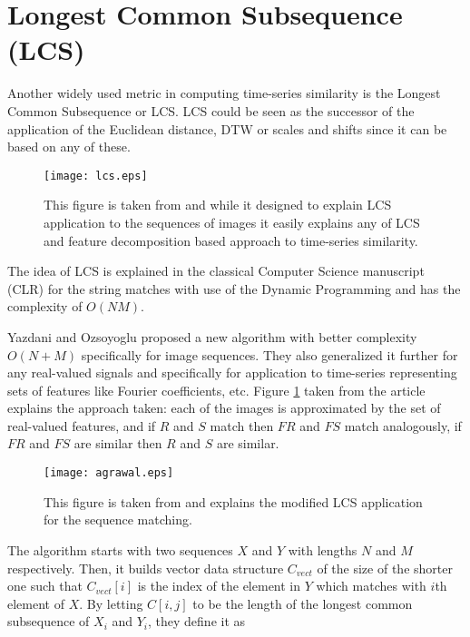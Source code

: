 \section{Longest Common Subsequence (LCS) } \label{lcs}
Another widely used metric in computing time-series similarity is the Longest Common Subsequence or LCS. LCS could be seen as the successor of the application of the Euclidean distance, DTW or scales and shifts \cite{citeulike:3816327} since it can be based on any of these. 
\begin{figure}[tbp]
   \centering
   \texttt{[image: lcs.eps]}
   \caption{This figure is taken from \cite{citeulike:4367061} and while it designed to explain LCS application to the sequences of images it easily explains any of LCS and feature decomposition based approach to time-series similarity.}
   \label{fig:lcs}
\end{figure} 
The idea of LCS is explained in the classical Computer Science manuscript \cite{citeulike:180287} (CLR) for the string matches with use of the Dynamic Programming and has the complexity of $O(NM)$. 

Yazdani and Ozsoyoglu \cite{citeulike:4367061} proposed a new algorithm with better complexity $O(N+M)$ specifically for image sequences. They also generalized it further for any real-valued signals and specifically for application to time-series representing sets of features like Fourier coefficients, etc. Figure \ref{fig:lcs} taken from the article explains the approach taken: each of the images is approximated by the set of real-valued features, and if $R$ and $S$ match then $FR$ and $FS$ match analogously, if $FR$ and $FS$ are similar then $R$ and $S$ are similar.

\begin{figure}[bp]
   \centering
   \texttt{[image: agrawal.eps]}
   \caption{This figure is taken from \cite{citeulike:3816327} and explains the modified LCS application for the sequence matching.}
   \label{fig:agrawal_lcs}
\end{figure} 

The algorithm starts with two sequences $X$ and $Y$ with lengths $N$ and $M$ respectively. Then, it builds vector data structure $C_{vect}$ of the size of the shorter one such that $C_{vect}[i]$ is the index of the element in $Y$ which matches with $i$th element of $X$. By letting $C[i,j]$ to be the length of the longest common subsequence of $X_{i}$ and $Y_{i}$, they define it as 

